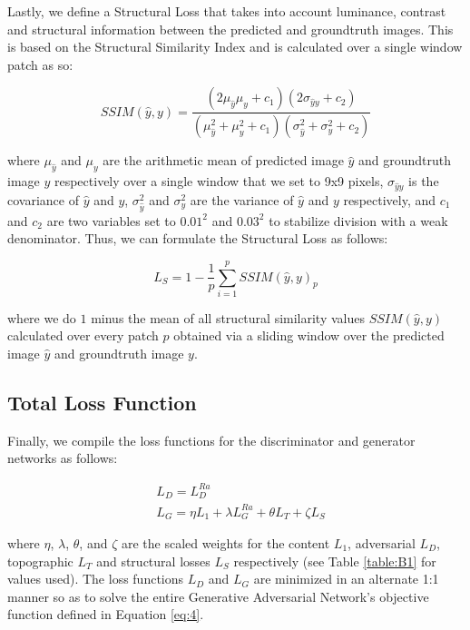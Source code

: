 \documentclass[tc, manuscript]{copernicus}
\begin{document}
Lastly, we define a Structural Loss that takes into account luminance, contrast and structural information between the predicted and groundtruth images.
This is based on the Structural Similarity Index \citep[SSIM,][]{WangImageQualityAssessment2004} and is calculated over a single window patch as so:

\begin{equation}\label{eq:A6}
  SSIM(\hat{y}, y) = \dfrac{(2\mu_{\hat{y}}\mu_y + c_1)(2\sigma_{{\hat{y}}y} + c_2)}{(\mu_{\hat{y}}^2 + \mu_y^2 + c_1)(\sigma_{\hat{y}}^2 + \sigma_y^2 + c_2)}
\end{equation}

where $\mu_{\hat{y}}$ and $\mu_y$ are the arithmetic mean of predicted image ${\hat{y}}$ and groundtruth image $y$ respectively over a single window that we set to 9x9 pixels, $\sigma_{{\hat{y}}y}$ is the covariance of ${\hat{y}}$ and $y$, $\sigma_{\hat{y}}^2$ and $\sigma_y^2$ are the variance of ${\hat{y}}$ and $y$ respectively, and $c_1$ and $c_2$ are two variables set to $0.01^2$ and $0.03^2$ to stabilize division with a weak denominator.
Thus, we can formulate the Structural Loss as follows:

\begin{equation}\label{eq:A7}
  L_S = 1 - \dfrac{1}{p} \sum\limits_{i=1}^p SSIM(\hat{y}, y)_p
\end{equation}

where we do $1$ minus the mean of all structural similarity values $SSIM(\hat{y}, y)$ calculated over every patch $p$ obtained via a sliding window over the predicted image ${\hat{y}}$ and groundtruth image $y$.

\subsection{Total Loss Function}

Finally, we compile the loss functions for the discriminator and generator networks as follows:

\begin{align}
  & L_D = L_D^{Ra} \label{eq:A8}\\
  & L_G = \eta L_1 + \lambda L_G^{Ra} + \theta L_T + \zeta L_S \label{eq:A9}
\end{align}

where $\eta$, $\lambda$, $\theta$, and $\zeta$ are the scaled weights for the content $L_1$, adversarial $L_D$, topographic $L_T$ and structural losses $L_S$ respectively (see Table \ref{table:B1} for values used).
The loss functions $L_D$ and $L_G$ are minimized in an alternate 1:1 manner so as to solve the entire Generative Adversarial Network's objective function defined in Equation \eqref{eq:4}.
\end{document}
